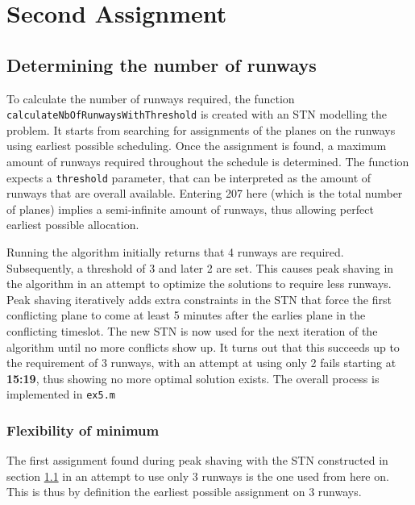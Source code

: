 \documentclass[10pt,a4paper]{article}
\begin{document}
\section{Second Assignment}
\subsection{Determining the number of runways}
\label{sec:nb_of_runways}
To calculate the number of runways required, the function  \texttt{calculateNbOfRunwaysWithThreshold} is created with an STN modelling the problem. It starts from searching for assignments of the planes on the runways using earliest possible scheduling. Once the assignment is found, a maximum amount of runways required throughout the schedule is determined. The function expects a \texttt{threshold} parameter, that can be interpreted as the amount of runways that are overall available. Entering 207 here (which is the total number of planes) implies a semi-infinite amount of runways, thus allowing perfect earliest possible allocation.

Running the algorithm initially returns that 4 runways are required. Subsequently, a threshold of 3 and later 2 are set. This causes peak shaving in the algorithm in an attempt to optimize the solutions to require less runways. Peak shaving iteratively adds extra constraints in the STN that force the first conflicting plane to come at least 5 minutes after the earlies plane in the conflicting timeslot. The new STN is now used for the next iteration of the algorithm until no more conflicts show up. It turns out that this succeeds up to the requirement of 3 runways, with an attempt at using only 2 fails starting at \textbf{15:19}, thus showing no more optimal solution exists. The overall process is implemented in \texttt{ex5.m}

\subsubsection{Flexibility of minimum}
The first assignment found during peak shaving with the STN constructed in section \ref{sec:nb_of_runways} in an attempt to use only 3 runways is the one used from here on. This is thus by definition the earliest possible assignment on 3 runways.
\end{document}
